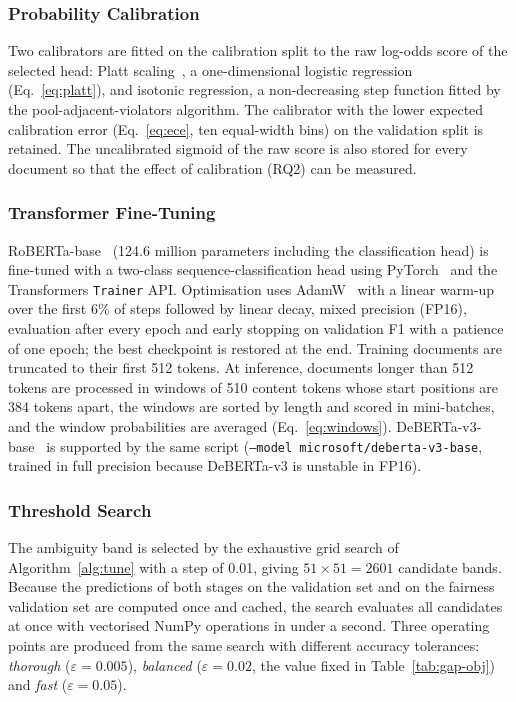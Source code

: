 \subsubsection{Probability Calibration}

Two calibrators are fitted on the calibration split to the raw log-odds score
of the selected head: Platt scaling~\cite{platt1999probabilistic}, a
one-dimensional logistic regression (Eq.~\eqref{eq:platt}), and isotonic
regression, a non-decreasing step function fitted by the
pool-adjacent-violators algorithm. The calibrator with the lower expected
calibration error (Eq.~\eqref{eq:ece}, ten equal-width bins) on the validation
split is retained. The uncalibrated sigmoid of the raw score is also stored for
every document so that the effect of calibration (RQ2) can be measured.

\subsubsection{Transformer Fine-Tuning}

RoBERTa-base~\cite{liu2019roberta} (124.6 million parameters including the
classification head) is fine-tuned with a two-class sequence-classification
head using PyTorch~\cite{paszke2019pytorch} and the Transformers
\texttt{Trainer} API. Optimisation uses AdamW~\cite{loshchilov2019adamw} with a
linear warm-up over the first 6\% of steps followed by linear decay, mixed
precision (FP16), evaluation after every epoch and early stopping on
validation F1 with a patience of one epoch; the best checkpoint is restored at
the end. Training documents are truncated to their first 512 tokens. At
inference, documents longer than 512 tokens are processed in windows of 510
content tokens whose start positions are 384 tokens apart, the windows are
sorted by length and scored in mini-batches, and the window probabilities are
averaged (Eq.~\eqref{eq:windows}). DeBERTa-v3-base~\cite{he2023debertav3} is
supported by the same script (\texttt{--model microsoft/deberta-v3-base},
trained in full precision because DeBERTa-v3 is unstable in FP16).

\subsubsection{Threshold Search}

The ambiguity band is selected by the exhaustive grid search of
Algorithm~\ref{alg:tune} with a step of 0.01, giving $51 \times 51 = 2601$
candidate bands. Because the predictions of both stages on the validation set
and on the fairness validation set are computed once and cached, the search
evaluates all candidates at once with vectorised NumPy operations in under a
second. Three operating points are produced from the same search with
different accuracy tolerances: \emph{thorough} ($\varepsilon=0.005$),
\emph{balanced} ($\varepsilon=0.02$, the value fixed in Table~\ref{tab:gap-obj})
and \emph{fast} ($\varepsilon=0.05$).

